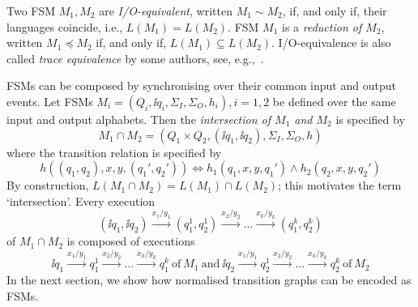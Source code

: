 
Two FSM $M_1, M_2$ are \emph{I/O-equivalent}, written $M_1\sim M_2$, if, and
only if, their languages coincide, i.e., $L(M_1) = L(M_2)$. FSM $M_1$ is a
\emph{reduction of $M_2$}, written $M_1 \preceq M_2$ if, and only if, $L(M_1)
\subseteq L(M_2)$. I/O-equivalence is also called \emph{trace equivalence} by
some authors, see, e.g.,~\cite{luo_test_1994}.


FSMs can be composed  by synchronising over their common input and
output events. Let FSMs $M_i=(Q_i, \ii{q_i}, \Sigma_I, \Sigma_O,  h_i), i =
1,2$ be defined over the same input and output alphabets. Then the \emph{intersection 
of $M_1$ and $M_2$} is specified by
$$
M_1 \cap M_2 = (Q_1\times Q_2, (\ii{q_1},\ii{q_2}),\Sigma_I, \Sigma_O, h)
$$
where the transition relation is specified by
$$
h((q_1,q_2),x,y,(q_1',q_2')) \Leftrightarrow h_1(q_1,x,y,q_1') \wedge h_2(q_2,x,y,q_2')
$$
By construction, $L(M_1 \cap M_2) = L(M_1) \cap L(M_2)$; this motivates the term `intersection'. Every execution
$$
(\ii{q_1},\ii{q_2}) \xrightarrow{x_1/y_1} (q_1^1,q_2^1)
\xrightarrow{x_2/y_2} \dots \xrightarrow{x_k/y_k} (q_1^{k},q_2^{k})
$$
of
$M_1\cap M_2$
is composed of executions
$$
\ii{q_1} \xrightarrow{x_1/y_1} q_1^1
\xrightarrow{x_2/y_2} \dots \xrightarrow{x_k/y_k} q_1^{k}\
\text{of}\ M_1\ \text{and}\
\ii{q_2} \xrightarrow{x_1/y_1} q_2^1
\xrightarrow{x_2/y_2} \dots \xrightarrow{x_k/y_k} q_2^{k}\
\text{of}\ M_2
$$
In the next section, we show how normalised transition graphs can be encoded
as   FSMs.
